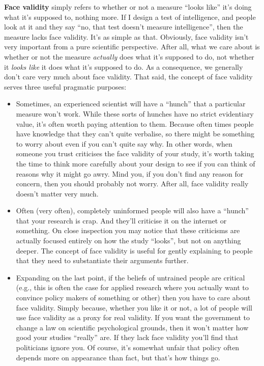 \documentclass[
  letterpaper,
]{book}
\providecommand{\tightlist}{%
  \setlength{\itemsep}{0pt}\setlength{\parskip}{0pt}}\usepackage{longtable,booktabs,array}
\begin{document}
\textbf{Face validity} simply refers to whether or not a measure ``looks
like'' it's doing what it's supposed to, nothing more. If I design a
test of intelligence, and people look at it and they say ``no, that test
doesn't measure intelligence'', then the measure lacks face validity.
It's as simple as that. Obviously, face validity isn't very important
from a pure scientific perspective. After all, what we care about is
whether or not the measure \emph{actually} does what it's supposed to
do, not whether it \emph{looks like} it does what it's supposed to do.
As a consequence, we generally don't care very much about face validity.
That said, the concept of face validity serves three useful pragmatic
purposes:

\begin{itemize}
\tightlist
\item
  Sometimes, an experienced scientist will have a ``hunch'' that a
  particular measure won't work. While these sorts of hunches have no
  strict evidentiary value, it's often worth paying attention to them.
  Because often times people have knowledge that they can't quite
  verbalise, so there might be something to worry about even if you
  can't quite say why. In other words, when someone you trust criticises
  the face validity of your study, it's worth taking the time to think
  more carefully about your design to see if you can think of reasons
  why it might go awry. Mind you, if you don't find any reason for
  concern, then you should probably not worry. After all, face validity
  really doesn't matter very much.
\item
  Often (very often), completely uninformed people will also have a
  ``hunch'' that your research is crap. And they'll criticise it on the
  internet or something. On close inspection you may notice that these
  criticisms are actually focused entirely on how the study ``looks'',
  but not on anything deeper. The concept of face validity is useful for
  gently explaining to people that they need to substantiate their
  arguments further.
\item
  Expanding on the last point, if the beliefs of untrained people are
  critical (e.g., this is often the case for applied research where you
  actually want to convince policy makers of something or other) then
  you have to care about face validity. Simply because, whether you like
  it or not, a lot of people will use face validity as a proxy for real
  validity. If you want the government to change a law on scientific
  psychological grounds, then it won't matter how good your studies
  ``really'' are. If they lack face validity you'll find that
  politicians ignore you. Of course, it's somewhat unfair that policy
  often depends more on appearance than fact, but that's how things go.
\end{itemize}
\end{document}
